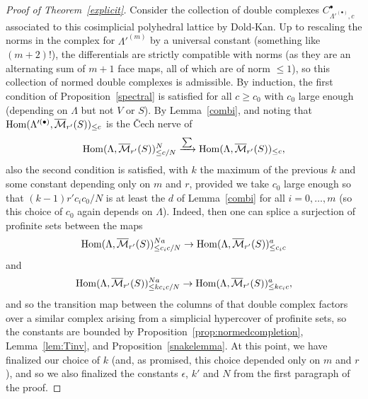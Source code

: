 \begin{proof}[Proof of Theorem~\ref{explicit}]
Consider the collection of double complexes $C_{\Lambda'^{(\bullet)},c}^\bullet$ associated to this cosimplicial polyhedral lattice by Dold-Kan. Up to rescaling the norms in the complex for $\Lambda'^{(m)}$ by a universal constant (something like $(m+2)!$), the differentials are strictly compatible with norms (as they are an alternating sum of $m+1$ face maps, all of which are of norm $\leq 1$), so this collection of normed double complexes is admissible. By induction, the first condition of Proposition~\ref{spectral} is satisfied for all $c\geq c_0$ with $c_0$ large enough (depending on $\Lambda$ but not $V$ or $S$). By Lemma~\ref{combi}, and noting that $\operatorname{Hom}(\Lambda'^{(\bullet)},\overline{\mathcal M}_{r'}(S))_{\leq c}$ is the \v{C}ech nerve of
\[
\operatorname{Hom}(\Lambda,\overline{\mathcal M}_{r'}(S))_{\leq c/N}^N\xrightarrow{\sum} \operatorname{Hom}(\Lambda,\overline{\mathcal M}_{r'}(S))_{\leq c},
\]
also the second condition is satisfied, with $k$ the maximum of the previous $k$ and some constant depending only on $m$ and $r$, provided we take $c_0$ large enough so that $(k-1)r'c_ic_0/N$ is at least the $d$ of Lemma~\ref{combi} for all $i=0,\ldots,m$ (so this choice of $c_0$ again depends on $\Lambda$). Indeed, then one can splice a surjection of profinite sets between the maps
\[
\operatorname{Hom}(\Lambda,\overline{\mathcal M}_{r'}(S))_{\leq c_ic/N}^{Na}\to\operatorname{Hom}(\Lambda,\overline{\mathcal M}_{r'}(S))_{\leq c_ic}^a
\]
and
\[
\operatorname{Hom}(\Lambda,\overline{\mathcal M}_{r'}(S))_{\leq kc_ic/N}^{Na}\to \operatorname{Hom}(\Lambda,\overline{\mathcal M}_{r'}(S))_{\leq kc_ic}^a,
\]
and so the transition map between the columns of that double complex factors over a similar complex arising from a simplicial hypercover of profinite sets, so the constants are bounded by Proposition~\ref{prop:normedcompletion}, Lemma~\ref{lem:Tinv}, and Proposition~\ref{snakelemma}. At this point, we have finalized our choice of $k$ (and, as promised, this choice depended only on $m$ and $r$), and so we also finalized the constants $\epsilon$, $k'$ and $N$ from the first paragraph of the proof.


\end{proof}
